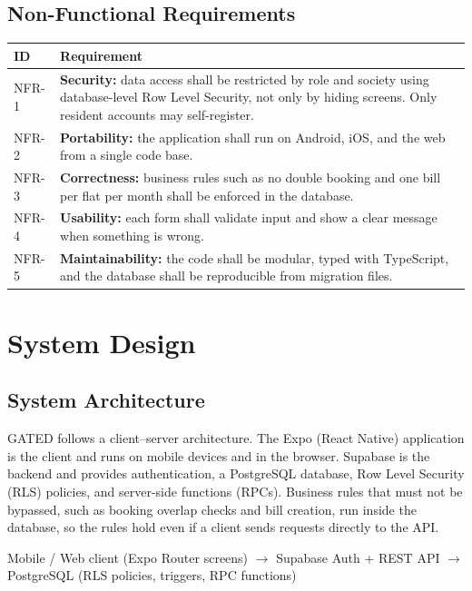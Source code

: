 \documentclass{tietreport}
\renewcommand{\_}{\textunderscore\allowbreak}
\begin{document}
\subsection{Non-Functional Requirements}

\begin{longtable}{L{1.6cm} L{12.2cm}}
\toprule
\textbf{ID} & \textbf{Requirement} \\
\midrule
\endhead
NFR-1 & \textbf{Security:} data access shall be restricted by role and
society using database-level Row Level Security, not only by hiding screens.
Only resident accounts may self-register. \\
NFR-2 & \textbf{Portability:} the application shall run on Android, iOS, and
the web from a single code base. \\
NFR-3 & \textbf{Correctness:} business rules such as no double booking and
one bill per flat per month shall be enforced in the database. \\
NFR-4 & \textbf{Usability:} each form shall validate input and show a clear
message when something is wrong. \\
NFR-5 & \textbf{Maintainability:} the code shall be modular, typed with
TypeScript, and the database shall be reproducible from migration files. \\
\bottomrule
\end{longtable}


\section{System Design}

\subsection{System Architecture}

GATED follows a client--server architecture. The Expo (React Native)
application is the client and runs on mobile devices and in the browser.
Supabase is the backend and provides authentication, a PostgreSQL database,
Row Level Security (RLS) policies, and server-side functions (RPCs).
Business rules that must not be bypassed, such as booking overlap checks and
bill creation, run inside the database, so the rules hold even if a client
sends requests directly to the API.

\begin{center}
Mobile / Web client (Expo Router screens)
$\rightarrow$
Supabase Auth + REST API
$\rightarrow$
PostgreSQL (RLS policies, triggers, RPC functions)
\end{center}
\end{document}
